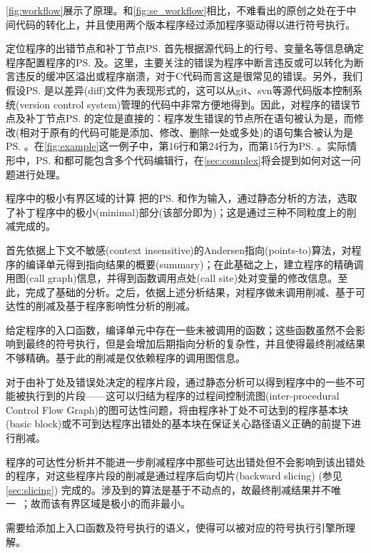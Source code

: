 \autoref{fig:workflow}展示了\dryrun 原理。和\autoref{fig:se_workflow}相比，不难看出\dryrun 的原创之处在于中间代码的转化上，并且使用两个版本程序经过添加程序驱动得以进行符号执行。

\noindent\textsf{定位程序\prog 的出错节点\prog\bs 和补丁节点\prog\ps\quad } 
\dryrun 首先根据源代码上的行号、变量名等信息确定程序配置程序的\prog\ps 及\prog\bs 。这里，\dryrun 主要关注的错误为程序中断言违反或可以转化为断言违反的缓冲区溢出或程序崩溃，对于C代码而言这是很常见的错误。另外，我们假设\prog\ps 是以差异(diff)文件为表现形式的，这可以从git、svn等源代码版本控制系统(version control system)管理的代码中非常方便地得到。因此，对程序\prog 的错误节点\prog\bs 及补丁节点\prog\ps 的定位是直接的：程序发生错误的节点所在语句被认为是\prog\bs，而修改(相对于原有的代码可能是添加、修改、删除一处或多处)的语句集合被认为是\prog\ps 。在\autoref{fig:example}这一例子中，第16行和第24行为\prog\bs ，而第15行为\prog\ps 。实际情形中，\prog\ps 和\prog\bs 都可能包含多个代码编辑行，在{\autoref{sec:complex}}将会提到如何对这一问题进行处理。

\noindent\textsf{程序中的极小有界区域的计算\quad} 
把\prog 的\prog\ps 和\prog\bs 作为输入，通过静态分析的方法，\dryrun 选取了补丁程序中的极小(minimal)部分(该部分即为\rbscope)；这是通过三种不同粒度上的削减完成的。

首先依据上下文不敏感(context insensitive)的Andersen指向(points-to)算法，对程序的编译单元得到指向结果的概要(summary)；在此基础之上，建立程序的精确调用图(call graph)信息，并得到函数调用点处(call site)处对变量的修改信息。至此，完成了基础的分析。之后，依据上述分析结果，对程序做未调用削减、基于可达性的削减及基于程序影响性分析的削减。

给定程序的入口函数，编译单元中存在一些未被调用的函数；这些函数虽然不会影响到最终的符号执行，但是会增加后期指向分析的复杂性，并且使得最终削减结果不够精确。基于此的削减是仅依赖程序的调用图信息。

对于由补丁处及错误处决定的程序片段，通过静态分析可以得到程序中的一些不可能被执行到的片段——这可以归结为程序的过程间控制流图(inter-procedural Control Flow Graph)的图可达性问题，将由程序补丁处不可达到的程序基本块(basic block)或不可到达程序出错处的基本块在保证关心路径语义正确的前提下进行削减。

程序的可达性分析并不能进一步削减程序中那些可达出错处但不会影响到该出错处的程序，对这些程序片段的削减是通过程序后向切片(backward slicing) (参见\ref{sec:slicing}) 完成的。涉及到的算法是基于不动点的，故最终削减结果并不唯一~；故而该有界区域是极小的而非最小。

\dryrun 需要给\rbscope 添加上入口函数及符号执行的语义，使得可以被对应的符号执行引擎所理解。

